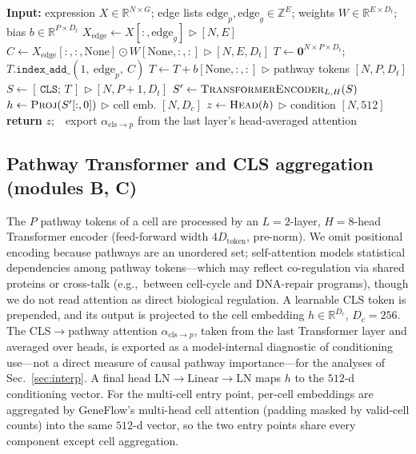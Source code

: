 \documentclass[journal]{IEEEtran}
\newcommand{\eg}{e.g.,}
\begin{document}
\begin{algorithm}[t]
\caption{Pathway-bottleneck encoder (single-cell forward)}
\label{alg:encoder}
\begin{algorithmic}[1]
\STATE \textbf{Input:} expression $X\in\mathbb{R}^{N\times G}$; edge lists
$\text{edge}_p,\text{edge}_g\in\mathbb{Z}^{E}$; weights $W\in\mathbb{R}^{E\times
D_t}$; bias $b\in\mathbb{R}^{P\times D_t}$
\STATE $X_{\text{edge}} \leftarrow X[:,\text{edge}_g]$ \hfill $\triangleright\ [N,E]$
\STATE $C \leftarrow X_{\text{edge}}[:,:,\text{None}] \odot W[\text{None},:,:]$ \hfill $\triangleright\ [N,E,D_t]$
\STATE $T \leftarrow \mathbf{0}^{N\times P\times D_t}$;\ \ $T.\texttt{index\_add\_}(1,\ \text{edge}_p,\ C)$
\STATE $T \leftarrow T + b[\text{None},:,:]$ \hfill $\triangleright$ pathway tokens $[N,P,D_t]$
\STATE $S \leftarrow [\,\texttt{CLS};\, T\,]$ \hfill $\triangleright\ [N,P{+}1,D_t]$
\STATE $S' \leftarrow \textsc{TransformerEncoder}_{L,H}(S)$ 
\STATE $h \leftarrow \textsc{Proj}(S'[:,0])$ \hfill $\triangleright$ cell emb. $[N,D_c]$
\STATE $z \leftarrow \textsc{Head}(h)$ \hfill $\triangleright$ condition $[N,512]$
\STATE \textbf{return} $z$;\ \ export $\alpha_{\text{cls}\to p}$ from the last layer's head-averaged attention
\end{algorithmic}
\end{algorithm}

\subsection{Pathway Transformer and CLS aggregation (modules B, C)}
The $P$ pathway tokens of a cell are processed by an $L{=}2$-layer, $H{=}8$-head
Transformer encoder (feed-forward width $4D_{\text{token}}$, pre-norm). We omit
positional encoding because pathways are an unordered set; self-attention models
statistical dependencies among pathway tokens---which may reflect co-regulation
via shared proteins or cross-talk (\eg\ between cell-cycle and DNA-repair
programs), though we do not read attention as direct biological regulation. A learnable CLS token is prepended, and
its output is projected to the cell embedding $h\in\mathbb{R}^{D_c}$, $D_c{=}256$.
The CLS$\rightarrow$pathway attention $\alpha_{\text{cls}\to p}$, taken from the
last Transformer layer and averaged over heads, is exported as a model-internal
diagnostic of conditioning use---not a direct measure of causal pathway importance---for the analyses of Sec.~\ref{sec:interp}. A
final head $\mathrm{LN}\!\rightarrow\!\mathrm{Linear}\!\rightarrow\!\mathrm{LN}$
maps $h$ to the $512$-d conditioning vector. For the multi-cell entry point,
per-cell embeddings are aggregated by GeneFlow's multi-head cell attention
(padding masked by valid-cell counts) into the same $512$-d vector, so the two
entry points share every component except cell aggregation.
\end{document}
